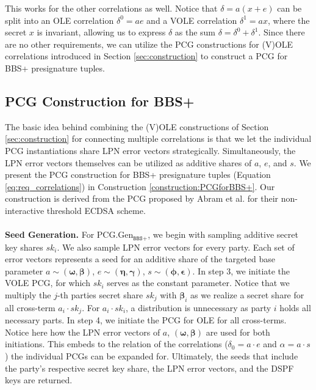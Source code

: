This works for the other correlations as well. Notice that $\delta = a(x+e)$ can be split into an OLE correlation $\delta^0 = ae$ and a VOLE correlation $\delta^1 = ax$, where the secret $x$ is invariant, allowing us to express $\delta$ as the sum $\delta = \delta^0 + \delta^1$. Since there are no other requirements, we can utilize the PCG constructions for (V)OLE correlations introduced in Section \ref{sec:construction} to construct a PCG for BBS+ presignature tuples.

\subsection{PCG Construction for BBS+}
\label{subsec:pcgForBBs+}
The basic idea behind combining the (V)OLE constructions of Section \ref{sec:construction} for connecting multiple correlations is that we let the individual PCG instantiations share LPN error vectors strategically. Simultaneously, the LPN error vectors themselves can be utilized as additive shares of $a$, $e$, and $s$. We present the PCG construction for BBS+ presignature tuples (Equation \ref{eq:req_correlations}) in Construction \ref{construction:PCGforBBS+}. Our construction is derived from the PCG proposed by Abram et al. \cite{abram2022low} for their non-interactive threshold ECDSA scheme.
\\\\
\textbf{Seed Generation.} For PCG.Gen$_{\texttt{BBS+}}$, we begin with sampling additive secret key shares $sk_i$. We also sample LPN error vectors for every party. Each set of error vectors represents a seed for an additive share of the targeted base parameter $a \sim (\boldsymbol{\omega}, \boldsymbol{\beta})$, $e \sim (\boldsymbol{\eta}, \boldsymbol{\gamma})$, $s \sim (\boldsymbol{\phi}, \boldsymbol{\epsilon})$. In step 3, we initiate the VOLE PCG, for which $sk_i$ serves as the constant parameter. Notice that we multiply the $j$-th parties secret share $sk_j$ with $\boldsymbol{\beta}_i$ as we realize a secret share for all cross-term $a_i\cdot sk_j$. For $a_i\cdot sk_i$, a distribution is unnecessary as party $i$ holds all necessary parts. In step 4, we initiate the PCG for OLE for all cross-terms. Notice here how the LPN error vectors of $a$, $(\boldsymbol{\omega}, \boldsymbol{\beta})$ are used for both initiations. This embeds to the relation of the correlations ($\delta_0 = a\cdot e$ and $\alpha = a\cdot s$) the individual PCGs can be expanded for. Ultimately, the seeds that include the party's respective secret key share, the LPN error vectors, and the DSPF keys are returned.
